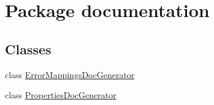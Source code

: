 \hypertarget{namespacedocumentation}{}\section{Package documentation}
\label{namespacedocumentation}
\subsection*{Classes}
\begin{DoxyCompactItemize}
\item 
class \mbox{\hyperlink{classdocumentation_1_1_error_mappings_doc_generator}{Error\+Mappings\+Doc\+Generator}}
\item 
class \mbox{\hyperlink{classdocumentation_1_1_properties_doc_generator}{Properties\+Doc\+Generator}}
\end{DoxyCompactItemize}
